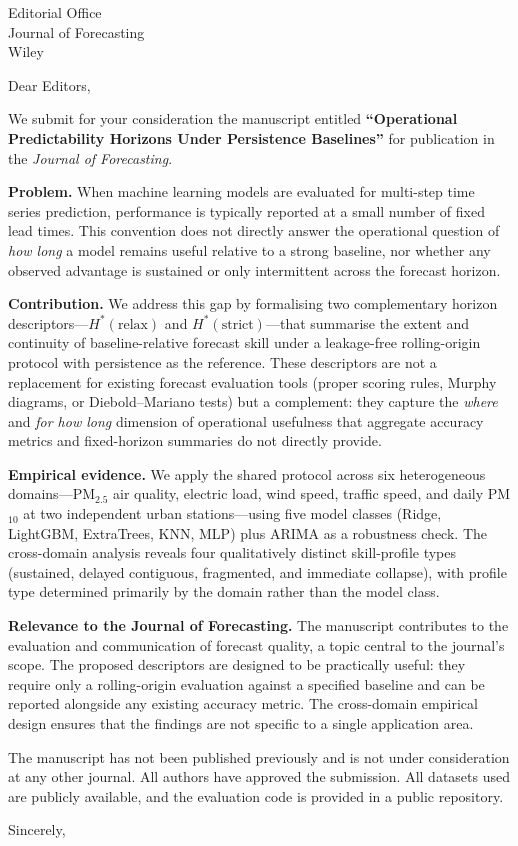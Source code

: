 \documentclass[11pt]{letter}
\date{\today}
\begin{document}
\begin{letter}{Editorial Office\\
Journal of Forecasting\\
Wiley}

\opening{Dear Editors,}

We submit for your consideration the manuscript entitled \textbf{``Operational Predictability Horizons Under Persistence Baselines''} for publication in the \textit{Journal of Forecasting}.

\textbf{Problem.}
When machine learning models are evaluated for multi-step time series prediction, performance is typically reported at a small number of fixed lead times. This convention does not directly answer the operational question of \emph{how long} a model remains useful relative to a strong baseline, nor whether any observed advantage is sustained or only intermittent across the forecast horizon.

\textbf{Contribution.}
We address this gap by formalising two complementary horizon descriptors---$H^*(\mathrm{relax})$ and $H^*(\mathrm{strict})$---that summarise the extent and continuity of baseline-relative forecast skill under a leakage-free rolling-origin protocol with persistence as the reference. These descriptors are not a replacement for existing forecast evaluation tools (proper scoring rules, Murphy diagrams, or Diebold--Mariano tests) but a complement: they capture the \emph{where} and \emph{for how long} dimension of operational usefulness that aggregate accuracy metrics and fixed-horizon summaries do not directly provide.

\textbf{Empirical evidence.}
We apply the shared protocol across six heterogeneous domains---PM$_{2.5}$ air quality, electric load, wind speed, traffic speed, and daily PM$_{10}$ at two independent urban stations---using five model classes (Ridge, LightGBM, ExtraTrees, KNN, MLP) plus ARIMA as a robustness check. The cross-domain analysis reveals four qualitatively distinct skill-profile types (sustained, delayed contiguous, fragmented, and immediate collapse), with profile type determined primarily by the domain rather than the model class.

\textbf{Relevance to the Journal of Forecasting.}
The manuscript contributes to the evaluation and communication of forecast quality, a topic central to the journal's scope. The proposed descriptors are designed to be practically useful: they require only a rolling-origin evaluation against a specified baseline and can be reported alongside any existing accuracy metric. The cross-domain empirical design ensures that the findings are not specific to a single application area.

The manuscript has not been published previously and is not under consideration at any other journal. All authors have approved the submission. All datasets used are publicly available, and the evaluation code is provided in a public repository.

\closing{Sincerely,}

\end{letter}
\end{document}
